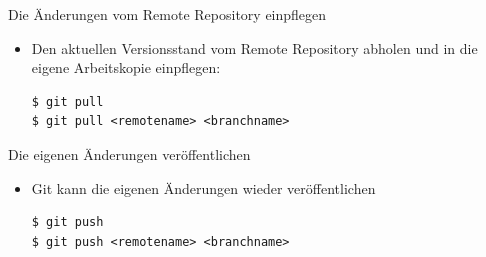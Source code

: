 \begin{frame}[fragile]{Die Änderungen vom Remote Repository einpflegen}
  \begin{itemize}
    \item Den aktuellen Versionsstand vom Remote Repository abholen und in die eigene Arbeitskopie einpflegen:
    \begin{lstlisting}
$ git pull
$ git pull <remotename> <branchname>
    \end{lstlisting}
  \end{itemize}
\end{frame}

\begin{frame}[fragile]{Die eigenen Änderungen veröffentlichen}
  \begin{itemize}
    \item Git kann die eigenen Änderungen wieder veröffentlichen
    \begin{lstlisting}
$ git push
$ git push <remotename> <branchname>
    \end{lstlisting}
  \end{itemize}
\end{frame}

